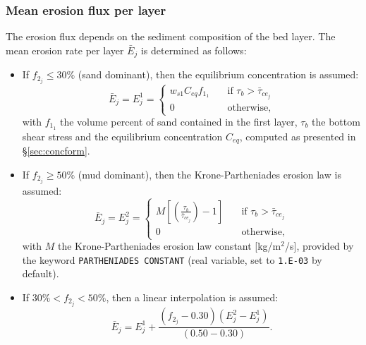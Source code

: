 \subsubsection{Mean erosion flux per layer}
The erosion flux depends on the sediment composition of the bed layer. The mean erosion rate per layer $\bar E_j$ is determined as follows:
\begin{itemize}
\item If $f_{2_j} \leq 30\%$ (sand dominant), then the equilibrium concentration is assumed:
\begin{equation*}
\bar E_j = E_j^1 = \left\{\begin{array}{ll}
w_{s1} C_{eq} f_{1_1} \quad & \text{if}\,\,\tau_b>\bar \tau_{ce_j}\\  
0\quad & \text{otherwise},
\end{array}
\right. 
\end{equation*}
with $f_{1_1}$ the volume percent of sand contained in the first layer, 
$\tau_b$ the bottom shear stress and the equilibrium concentration $C_{eq}$, computed as presented in \S\ref{sec:concform}. 
\item If $f_{2_j} \geq 50\%$ (mud dominant), then the Krone-Partheniades erosion law is assumed:
\begin{equation*}
\bar E_j = E_j^2 = \left\{\begin{array}{ll}
M\left[\left(\frac{\tau_b}{\bar \tau_{ce_j}}\right)-1\right]\quad & \text{if}\,\,\tau_b>\bar \tau_{ce_j}\\  
0\quad & \text{otherwise},
\end{array}
\right. 
\end{equation*}
with $M$ the Krone-Partheniades erosion law constant [kg/m$^2$/s], provided by the keyword \texttt{PARTHENIADES CONSTANT} (real variable, set to \texttt{1.E-03} by default).

\item If $30\% < f_{2_j} < 50\%$, then a linear interpolation is assumed:
\begin{equation*}
\bar E_j = E_j^1 + \frac{(f_{2_j}-0.30)(E_j^2-E_j^1)}{(0.50-0.30)}.
\end{equation*}

\end{itemize}

